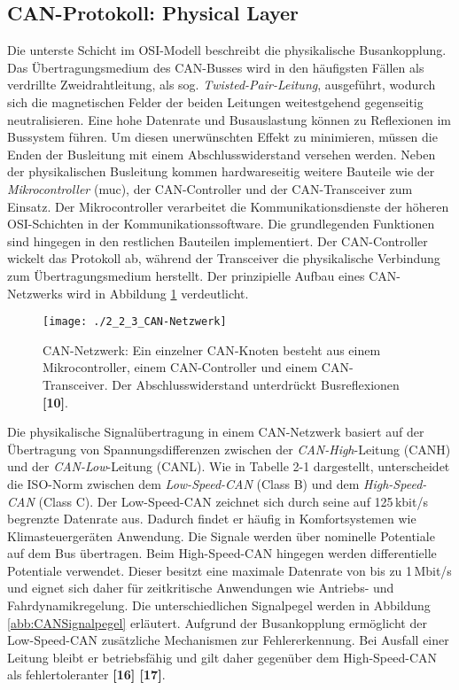 \subsection{CAN-Protokoll: Physical Layer} \label{subsec:PhysicalLayer}
Die unterste Schicht im \acs{OSI}-Modell beschreibt die physikalische Busankopplung. Das Übertragungsmedium des \acs{CAN}-Busses wird in den häufigsten Fällen als verdrillte Zweidrahtleitung, als sog. \emph{Twisted-Pair-Leitung}, ausgeführt, wodurch sich die magnetischen Felder der beiden Leitungen weitestgehend gegenseitig neutralisieren. Eine hohe Datenrate und Busauslastung können zu Reflexionen im Bussystem führen. Um diesen unerwünschten Effekt zu minimieren, müssen die Enden der Busleitung mit einem Abschlusswiderstand versehen werden. Neben der physikalischen Busleitung kommen hardwareseitig weitere Bauteile wie der \emph{Mikrocontroller} (\acs{muc}), der \acs{CAN}-Controller und der \acs{CAN}-Transceiver zum Einsatz. Der Mikrocontroller verarbeitet die Kommunikationsdienste der höheren \acs{OSI}-Schichten in der Kommunikationssoftware. Die grundlegenden Funktionen sind hingegen in den restlichen Bauteilen implementiert. Der \acs{CAN}-Controller wickelt das Protokoll ab, während der Transceiver die physikalische Verbindung zum Übertragungsmedium herstellt. Der prinzipielle Aufbau eines \acs{CAN}-Netzwerks wird in Abbildung \ref{abb:CANNetzwerk} verdeutlicht.

\begin{figure}[!htbp]
	\centering
	\texttt{[image: ./2\_2\_3\_CAN-Netzwerk]}
	\caption[CAN-Netzwerk]{CAN-Netzwerk: Ein einzelner \acs{CAN}-Knoten besteht aus einem Mikrocontroller, einem \acs{CAN}-Controller und einem \acs{CAN}-Transceiver. Der Abschlusswiderstand unterdrückt	Busreflexionen \textbf{[10]}.}
	\label{abb:CANNetzwerk}
\end{figure}

Die physikalische Signalübertragung in einem \acs{CAN}-Netzwerk basiert auf der Übertragung von Spannungsdifferenzen zwischen der \emph{\acs{CAN}-High}-Leitung (CANH) und der \emph{\acs{CAN}-Low}-Leitung (CANL). Wie in Tabelle 2-1 dargestellt, unterscheidet die \acs{ISO}-Norm zwischen dem \emph{Low-Speed-\acs{CAN}} (Class B) und dem \emph{High-Speed-\acs{CAN}} (Class C). Der Low-Speed-\acs{CAN} zeichnet sich durch seine auf 125\,kbit/s begrenzte Datenrate aus. Dadurch findet er häufig in Komfortsystemen wie Klimasteuergeräten Anwendung. Die Signale werden über nominelle Potentiale auf dem Bus übertragen. Beim High-Speed-\acs{CAN} hingegen werden differentielle Potentiale verwendet. Dieser besitzt eine maximale Datenrate von bis zu 1\,Mbit/s und eignet sich daher für zeitkritische Anwendungen wie Antriebs- und Fahrdynamikregelung. Die unterschiedlichen Signalpegel werden in Abbildung \ref{abb:CANSignalpegel} erläutert. Aufgrund der Busankopplung ermöglicht der Low-Speed-\acs{CAN} zusätzliche Mechanismen zur Fehlererkennung. Bei Ausfall einer Leitung bleibt er betriebsfähig und gilt daher gegenüber dem High-Speed-\acs{CAN} als fehlertoleranter \textbf{[16] [17]}.

